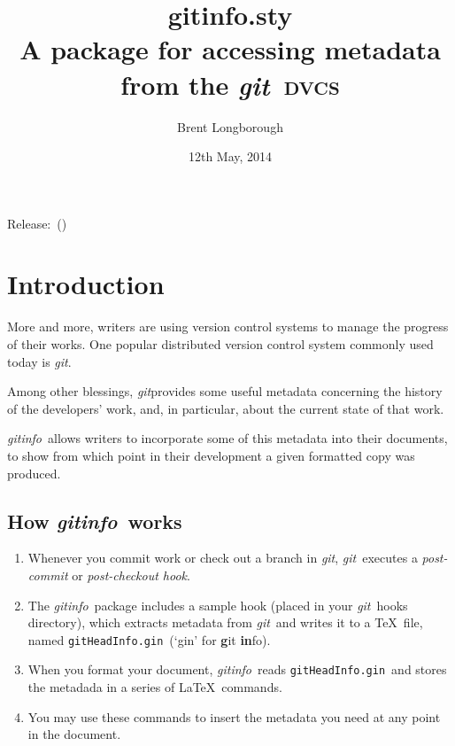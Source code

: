 \documentclass[a4paper,12pt,twoside,openany]{memoir}
\newcommand{\sfit}[1]{\textit{#1}}
\newcommand{\git}{\sfit{git}}
\newcommand{\tpname}{\sfit{gitinfo}}
\newcommand{\tpfname}{\textsf{gitinfo.sty}}
\newcommand{\ginname}{gitHeadInfo.gin}
\newcommand{\metaname}{\texttt{\ginname}}
\begin{document}
\frontmatter
\title{%
	\Huge \tpfname\\[2ex]%
	\Large A package for accessing metadata\\from the \git\ \textsc{dvcs}
	}
\author{Brent Longborough}
\date{12th May, 2014}
\maketitle

{\centering
Release:\gitReln\ (\gitAbbrevHash)\\
}
\begingroup
\thispagestyle{empty}
\setlength{\afterchapskip}{20pt}
\let\clearpage\relax
\let\chaptitlefont\Large\bfseries
\vspace*{5\baselineskip}
\tableofcontents*
\endgroup
\mainmatter
\pagestyle{giruled}
\chapter{Introduction}
More and more, writers are using version control systems
to manage the progress of their works.
One popular distributed version control system commonly used today
is \git.

Among other blessings, \git provides
some useful metadata concerning the history of the developers'
work, and, in particular, about the current state of that work.

\tpname\ allows writers to incorporate some of this metadata
into their documents, to show from which point in their development
a given formatted copy was produced.

\section{How \tpname\ works}
\begin{enumerate}
\item Whenever you commit work or check out a branch in \git,
\git\ executes a \textit{post-commit} or \textit{post-checkout hook}.

\item The \tpname\ package includes a sample hook
(placed in your \git\ hooks directory),
which extracts metadata from \git\ and writes it to a \TeX\ file,
named \metaname\ (`gin' for \textbf{g}it \textbf{in}fo).

\item When you format your document, \tpname\ reads
\metaname\ and stores the metadada
in a series of \LaTeX\ commands.

\item You may use these commands to insert
the metadata you need at any point in the document.
\end{enumerate}
\end{document}
